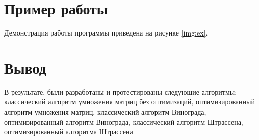 \pagebreak

\section{Пример работы}

Демонстрация работы программы приведена на рисунке \ref{img:ex}.


\section*{Вывод}

В результате, были разработаны и протестированы следующие алгоритмы: классический алгоритм умножения матриц без оптимизаций, оптимизированный алгоритм умножения матриц, классический алгоритм Винограда, оптимизированный алгоритм Винограда, классический алгоритм Штрассена, оптимизированный алгоритма Штрассена
